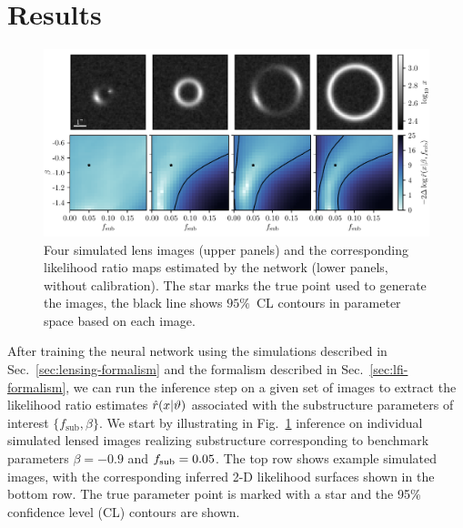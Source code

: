 \documentclass[twocolumn]{aastex62}
\begin{document}
\section{Results}
\label{sec:results}

\begin{figure}[t!]
\centering
\includegraphics[width=1.\textwidth]{figures/individual_lens_predictions}
\caption{Four simulated lens images (upper panels) and the corresponding likelihood ratio maps estimated by the network (lower panels, without calibration). The star marks the true point used to generate the images, the black line shows $95 \%$~CL contours in parameter space based on each image.}
\label{fig:individual_predictions}
\end{figure}

After training the neural network using the simulations described in Sec.~\ref{sec:lensing-formalism} and the formalism described in Sec.~\ref{sec:lfi-formalism}, we can run the inference step on a given set of images to extract the likelihood ratio estimates $\hat r(x | \vartheta)$ associated with the substructure parameters of interest $\{f_\mathrm{sub}, \beta\}$. We start by illustrating in Fig.~\ref{fig:individual_predictions} inference on individual simulated lensed images realizing substructure corresponding to benchmark parameters $\beta = -0.9$ and $f_{\mathrm{sub}} = 0.05$. The top row shows example simulated images, with the corresponding inferred 2-D likelihood surfaces shown in the bottom row. The true parameter point is marked with a star and the 95\% confidence level (CL) contours are shown.
\end{document}
